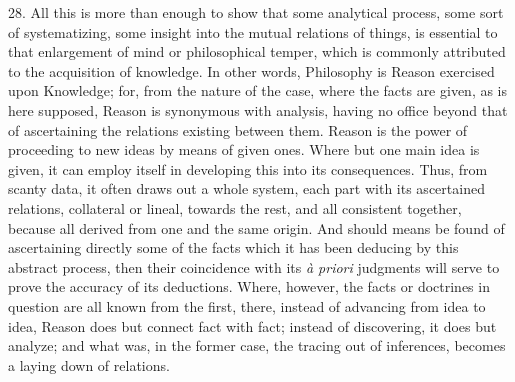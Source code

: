 28. All this is more than enough to show that some analytical
process, some sort of systematizing, some insight into the mutual
relations of things, is essential to that enlargement of mind or
philosophical temper, which is commonly attributed to the acquisition
of knowledge. In other words, Philosophy is Reason exercised upon
Knowledge; for, from the nature of the case, where the facts are
given, as is here supposed, Reason is synonymous with analysis, having
no office beyond that of ascertaining the relations existing between
them. Reason is the power of proceeding to new ideas by means of given
ones. Where but one main idea is given, it can employ itself in
developing this into its consequences. Thus, from scanty data, it
often draws out a whole system, each part with its ascertained
relations, collateral or lineal, towards the rest, and all consistent
together, because all derived from one and the same origin. And should
means be found of ascertaining directly some of the facts which it has
been deducing by this abstract process, then their coincidence with
its \emph{à priori} judgments will serve to prove the accuracy of its
deductions. Where, however, the facts or doctrines in question are all
known from the first, there, instead of advancing from idea to idea,
Reason does but connect fact with fact; instead of discovering, it
does but analyze; and what was, in the former case, the tracing out of
inferences, becomes a laying down of relations.

